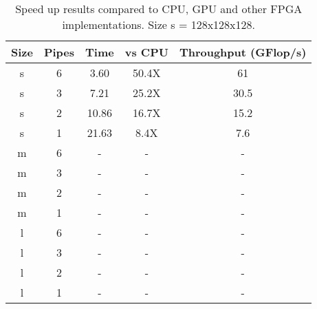 \begin{table}[!h]
  \centering
  \caption{Speed up results compared to CPU, GPU and other FPGA implementations. Size s = 128x128x128.}
  \label{speedup}
  \begin{tabular}{ ccccc}
    Size & Pipes & Time  & vs CPU & Throughput (GFlop/s) \\ \hline
    s    & 6     & 3.60  & 50.4X  & 61                   \\
    s    & 3     & 7.21  & 25.2X  & 30.5                 \\
    s    & 2     & 10.86 & 16.7X  & 15.2                 \\
    s    & 1     & 21.63 & 8.4X   & 7.6                  \\\hline
    m    & 6     & -     & -      & -                    \\
    m    & 3     & -     & -      & -                    \\
    m    & 2     & -     & -      & -                    \\
    m    & 1     & -     & -      & -                    \\ \hline
    l    & 6     & -     & -      & -                    \\
    l    & 3     & -     & -      & -                    \\
    l    & 2     & -     & -      & -                    \\
    l    & 1     & -     & -      & -                    \\
  \end{tabular}
\end{table}
